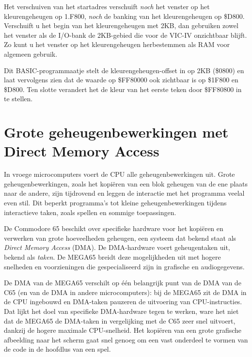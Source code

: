 Het verschuiven van het startadres verschuift {\em noch} het venster op het kleurengeheugen op 1.F800, {\em noch} de banking van het kleurengeheugen op \$D800. Verschuift u het begin van het kleurengeheugen met 2KB, dan gebruiken zowel het venster als de I/O-bank de 2KB-gebied die voor de VIC-IV onzichtbaar blijft. Zo kunt u het venster op het kleurengeheugen herbestemmen als RAM voor algemeen gebruik.

Dit BASIC-programmaatje stelt de kleurengeheugen-offset in op 2KB (\$0800) en laat vervolgens zien dat de waarde op \$FF80000 ook zichtbaar is op \$1F800 en \$D800. Ten slotte verandert het de kleur van het eerste teken door \$FF80800 in te stellen.



\newpage
\section{Grote geheugenbewerkingen met Direct Memory Access}

In vroege microcomputers voert de CPU alle geheugenbewerkingen uit. Grote geheugenbewerkingen, zoals het kopiëren van een blok geheugen van de ene plaats naar de andere, zijn tijdrovend en leggen de interactie met het programma veelal even stil. Dit beperkt programma's tot kleine geheugenbewerkingen tijdens interactieve taken, zoals spellen en sommige toepassingen.

De Commodore 65 beschikt over specifieke hardware voor het kopiëren en verwerken van grote hoeveelheden geheugen, een systeem dat bekend staat als {\em Direct Memory Access} (DMA). De DMA-hardware voert geheugentaken uit, bekend als {\em taken}. De MEGA65 breidt deze mogelijkheden uit met hogere snelheden en voorzieningen die gespecialiseerd zijn in grafische en audiogegevens.

De DMA van de MEGA65 verschilt op één belangrijk punt van de DMA van de C65 (en van de DMA in andere microcomputers): bij de MEGA65 zit de DMA in de CPU ingebouwd en DMA-taken pauzeren de uitvoering van CPU-instructies. Dat lijkt het doel van specifieke DMA-hardware tegen te werken, ware het niet dat de MEGA65 de DMA-taken in vergelijking met de C65 zeer snel uitvoert, dankzij de hogere maximale CPU-snelheid. Het kopiëren van een grote grafische afbeelding naar het scherm gaat snel genoeg om een vast onderdeel te vormen van de code in de hoofdlus van een spel.

